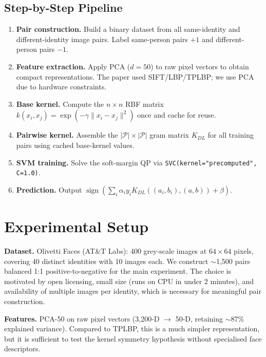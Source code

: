 \documentclass[conference]{IEEEtran}
\begin{document}
\subsection{Step-by-Step Pipeline}

\begin{enumerate}
  \item \textbf{Pair construction.} Build a binary dataset from all
        same-identity and different-identity image pairs. Label same-person
        pairs $+1$ and different-person pairs $-1$.
  \item \textbf{Feature extraction.} Apply PCA ($d=50$) to raw pixel
        vectors to obtain compact representations. The paper used
        SIFT/LBP/TPLBP; we use PCA due to hardware constraints.
  \item \textbf{Base kernel.} Compute the $n\!\times\!n$ RBF matrix
        $k(x_i,x_j)=\exp\!\left(-\gamma\|x_i-x_j\|^2\right)$ once and
        cache for reuse.
  \item \textbf{Pairwise kernel.} Assemble the
        $|\mathcal{P}|\!\times\!|\mathcal{P}|$ gram matrix $K_{DL}$ for
        all training pairs using cached base-kernel values.
  \item \textbf{SVM training.} Solve the soft-margin QP
        via \texttt{SVC(kernel="precomputed", C=1.0)}.
  \item \textbf{Prediction.} Output $\operatorname{sign}\!(\sum_i \alpha_i y_i K_{DL}((a_i,b_i),(a,b))+\beta)$.
\end{enumerate}

\section{Experimental Setup}

\textbf{Dataset.}
Olivetti Faces (AT\&T Labs): 400 grey-scale images at $64\!\times\!64$
pixels, covering 40 distinct identities with 10 images each. We construct
$\sim$1,500 pairs balanced 1:1 positive-to-negative for the main
experiment. The choice is motivated by open licensing, small size (runs
on CPU in under 2 minutes), and availability of multiple images per
identity, which is necessary for meaningful pair construction.

\textbf{Features.}
PCA-50 on raw pixel vectors (3,200-D $\to$ 50-D, retaining
$\sim$87\% explained variance). Compared to TPLBP, this is a much simpler
representation, but it is sufficient to test the kernel symmetry
hypothesis without specialised face descriptors.
\end{document}
